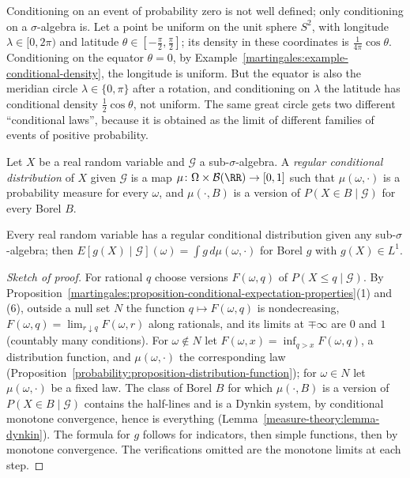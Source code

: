 \begin{counterexample}\label{martingales:counterexample-borel-kolmogorov}
Conditioning on an event of probability zero is not well defined; only conditioning on a $\sigma$-algebra is. Let a point be uniform on the unit sphere $S^2$, with longitude $\lambda \in [0, 2\pi)$ and latitude
$\theta \in [-\frac\pi2, \frac\pi2]$; its density in these coordinates is $\frac{1}{4\pi}\cos\theta$. Conditioning on the equator $\theta = 0$, by Example~\ref{martingales:example-conditional-density}, the longitude is uniform. But the
equator is also the meridian circle $\lambda \in \{0, \pi\}$ after a rotation, and conditioning on $\lambda$ the latitude has conditional density $\frac12\cos\theta$, not uniform. The same great circle gets two different
``conditional laws'', because it is obtained as the limit of different families of events of positive probability.
\end{counterexample}

\begin{definition}\label{martingales:definition-regular-conditional}
Let $X$ be a real random variable and $\mathcal{G}$ a sub-$\sigma$-algebra. A \emph{regular conditional distribution} of $X$ given $\mathcal{G}$ is a map $\mu \colon \Omega \times \mathcal{B}(\RR) \to [0, 1]$ such that
$\mu(\omega, \cdot)$ is a probability measure for every $\omega$, and $\mu(\cdot, B)$ is a version of $P(X \in B \mid \mathcal{G})$ for every Borel $B$.
\end{definition}

\begin{theorem}\label{martingales:theorem-regular-conditional}
Every real random variable has a regular conditional distribution given any sub-$\sigma$-algebra; then $E[g(X) \mid \mathcal{G}](\omega) = \int g\,d\mu(\omega, \cdot)$ for Borel $g$ with $g(X) \in L^1$.
\end{theorem}

\begin{proof}[Sketch of proof]
For rational $q$ choose versions $F(\omega, q)$ of $P(X \leq q \mid \mathcal{G})$. By Proposition~\ref{martingales:proposition-conditional-expectation-properties}(1) and (6), outside a null set $N$ the function $q \mapsto F(\omega, q)$
is nondecreasing, $F(\omega, q) = \lim_{r \downarrow q}F(\omega, r)$ along rationals, and its limits at $\mp\infty$ are $0$ and $1$ (countably many conditions). For $\omega \notin N$ let $F(\omega, x) = \inf_{q > x}F(\omega, q)$, a distribution
function, and $\mu(\omega, \cdot)$ the corresponding law (Proposition~\ref{probability:proposition-distribution-function}); for $\omega \in N$ let $\mu(\omega, \cdot)$ be a fixed law. The class of Borel $B$ for which $\mu(\cdot, B)$ is a
version of $P(X \in B \mid \mathcal{G})$ contains the half-lines and is a Dynkin system, by conditional monotone convergence, hence is everything (Lemma~\ref{measure-theory:lemma-dynkin}). The formula for $g$ follows for
indicators, then simple functions, then by monotone convergence. The verifications omitted are the monotone limits at each step.
\end{proof}

